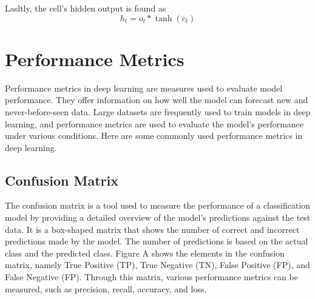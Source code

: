 Lasltly, the cell's hidden output is found as
\begin{equation}
    \label{equ:Output}
    h_t=o_t*\tanh(c_t)
\end{equation}

\section{Performance Metrics}
\label{sec3: performance_metrics}

Performance metrics in deep learning are measures used to evaluate model performance. They offer information on how well the model can forecast new and never-before-seen data. Large datasets are frequently used to train models in deep learning, and performance metrics are used to evaluate the model's performance under various conditions. Here are some commonly used performance metrics in deep learning.

\subsection{Confusion Matrix}
\label{subsec3: confusion_matrix}
The confusion matrix is a tool used to measure the performance of a classification model by providing a detailed overview of the model's predictions against the test data. It is a box-shaped matrix that shows the number of correct and incorrect predictions made by the model. The number of predictions is based on the actual class and the predicted class. Figure A shows the elements in the confusion matrix, namely True Positive (TP), True Negative (TN), False Positive (FP), and False Negative (FP). Through this matrix, various performance metrics can be measured, such as precision, recall, accuracy, and loss.

